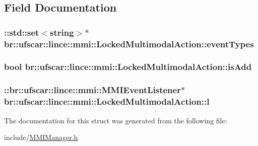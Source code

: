 \subsection{Field Documentation}
\hypertarget{structbr_1_1ufscar_1_1lince_1_1mmi_1_1LockedMultimodalAction_a3d8d1c55eacb7747c1e7d60fcb34a170}{
\subsubsection[{eventTypes}]{\setlength{\rightskip}{0pt plus 5cm}::std::set$<$string$>$$\ast$ {\bf br::ufscar::lince::mmi::LockedMultimodalAction::eventTypes}}}
\label{structbr_1_1ufscar_1_1lince_1_1mmi_1_1LockedMultimodalAction_a3d8d1c55eacb7747c1e7d60fcb34a170}
\hypertarget{structbr_1_1ufscar_1_1lince_1_1mmi_1_1LockedMultimodalAction_aaa42425599862561ea84845c72405b64}{
\subsubsection[{isAdd}]{\setlength{\rightskip}{0pt plus 5cm}bool {\bf br::ufscar::lince::mmi::LockedMultimodalAction::isAdd}}}
\label{structbr_1_1ufscar_1_1lince_1_1mmi_1_1LockedMultimodalAction_aaa42425599862561ea84845c72405b64}
\hypertarget{structbr_1_1ufscar_1_1lince_1_1mmi_1_1LockedMultimodalAction_a290d66a9a01a9a81283860247eeaff10}{
\subsubsection[{l}]{\setlength{\rightskip}{0pt plus 5cm}::{\bf br::ufscar::lince::mmi::MMIEventListener}$\ast$ {\bf br::ufscar::lince::mmi::LockedMultimodalAction::l}}}
\label{structbr_1_1ufscar_1_1lince_1_1mmi_1_1LockedMultimodalAction_a290d66a9a01a9a81283860247eeaff10}


The documentation for this struct was generated from the following file:\begin{DoxyCompactItemize}
\item 
include/\hyperlink{MMIManager_8h}{MMIManager.h}\end{DoxyCompactItemize}
